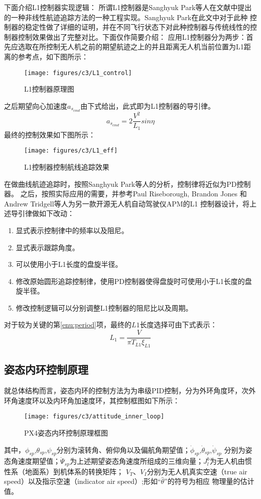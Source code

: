 下面介绍L1控制器实现逻辑：
所谓L1控制器是Sanghyuk Park等人在文献\cite{Park_2004}中提出的一种非线性航迹追踪方法的一种工程实现。Sanghyuk Park在此文中对于此种
控制器的稳定性做了详细的证明，并在不同飞行状态下对此种控制器与传统线性的控制器控制效果做出了完整对比。下面仅作简要介绍：
应用L1控制器分为两步：首先应选取在所控制无人机之前的期望航迹之上的并且距离无人机当前位置为L1距离的参考点，如下图\cite{Park_2004}所示：
\begin{figure}[H]
    \centering
    \texttt{[image: figures/c3/L1\_control]}
    \caption{L1控制器原理图}\label{fig:L1_control}
\end{figure}
之后期望向心加速度$a_{s_{cmd}}$由下式\cite{Park_2004}给出，此式即为L1控制器的导引律。
\begin{equation}
    a_{s_{cmd}}=2\frac{V^2}{L_1}sin\eta
\end{equation}
最终的控制效果如下图所示\cite{Park_2004}：
\begin{figure}[H]
    \centering
    \texttt{[image: figures/c3/L1\_eff]}
    \caption{L1控制器控制航线追踪效果}\label{fig：c3-L1_eff}
\end{figure}
在做曲线航迹追踪时，按照Sanghyuk Park等人的分析，控制律将近似为PD控制器。
之后，按照实际应用的需要，并参考Paul Riseborough, Brandon Jones 和 Andrew Tridgell等人为另一款开源无人机自动驾驶仪APM的L1
控制器设计，将上述导引律做如下改动：
\begin{enumerate}
    \item 显式表示控制律中的频率以及阻尼。
    \item 显式表示跟踪角度。
    \item 可以使用小于L1长度的盘旋半径。
    \item 修改原始圆形追踪控制律，使用PD控制器使得盘旋时可使用小于L1长度的盘旋半径。
    \item 修改控制逻辑可以分别调整L1控制器的阻尼比以及周期。\label{enu:period}
\end{enumerate}
对于较为关键的第\ref{enu:period}项，最终的$L1$长度选择可由下式表示：
 \begin{equation}
     L_1 = \frac{V}{\pi T_{L1} \xi_{L1}}
\end{equation}
\subsection{姿态内环控制原理}
就总体结构而言，姿态内环的控制方法为为串级PID控制，分为外环角度环，次外环角速度环以及内环角加速度环，其控制框图如下所示：
\begin{figure}[H]
    \centering
    \texttt{[image: figures/c3/attitude\_inner\_loop]}
    \caption{PX4姿态内环控制原理框图}\label{c3-attitude_inner_loop}
\end{figure}
其中，$\phi_{sp}$,$\theta_{sp}$,$\psi_{sp}$分别为滚转角、俯仰角以及偏航角期望值；$\dot{\phi}_{sp}$,$\dot{\theta}_{sp}$,$\dot{\psi}_{sp}$
分别为姿态角速度期望值；$\dot{\Psi}_{sp}$为上述期望姿态角速度所组成的三维向量；$J^{b}_l$为无人机由惯性系（地面系）到机体系的转换矩阵；
$V_T$、$V_I$分别为无人机真实空速（true air speed）以及指示空速（indicator air speed）;形如“$\hat{\theta}$”的符号为相应
物理量的估计值。

